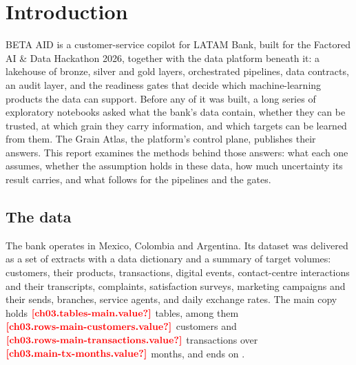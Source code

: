 \chapter{Introduction}\label{ch:introduction}

BETA AID is a customer-service copilot for LATAM Bank, built for the Factored AI \& Data Hackathon 2026, together with
the data platform beneath it: a lakehouse of bronze, silver and gold layers, orchestrated pipelines, data contracts,
an audit layer, and the readiness gates that decide which machine-learning products the data can support. Before any
of it was built, a long series of exploratory notebooks asked what the bank's data contain, whether they can be
trusted, at which grain they carry information, and which targets can be learned from them. The Grain Atlas, the
platform's control plane, publishes their answers. This report examines the methods behind those answers: what each
one assumes, whether the assumption holds in these data, how much uncertainty its result carries, and what follows
for the pipelines and the gates.

\section{The data}\label{sec:intro-data}

The bank operates in Mexico, Colombia and Argentina. Its dataset was delivered as a set of extracts with a data
dictionary and a summary of target volumes: customers, their products, transactions, digital events, contact-centre
interactions and their transcripts, complaints, satisfaction surveys, marketing campaigns and their sends, branches,
service agents, and daily exchange rates. The main copy holds $\est{ch03.tables-main}{value}$ tables, among them
$\est{ch03.rows-main-customers}{value}$ customers and $\est{ch03.rows-main-transactions}{value}$ transactions over
$\est{ch03.main-tx-months}{value}$ months, and ends on .

